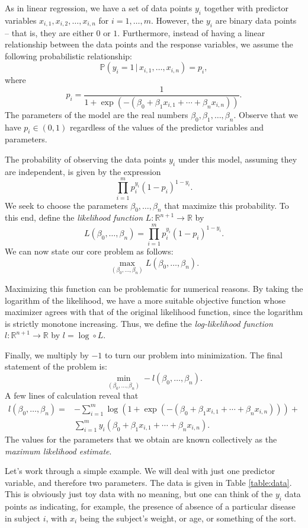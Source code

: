 As in linear regression, we have a set of data points $y_i$ together with predictor variables
$x_{i,1}, x_{i,2}, \ldots, x_{i,n}$ for $i = 1, \ldots, m$. However, the $y_i$ are binary data points --
that is, they are either $0$ or $1$. Furthermore, instead of having a linear relationship between the
data points and the response variables, we assume the following probabilistic relationship:
\[
\mathbb{P}(y_i = 1 \, | \, x_{i,1}, \ldots, x_{i,n}) = p_i,
\]
where
\[
p_i = \frac{1}{1+\exp(-(\beta_0 + \beta_1x_{i,1} + \cdots + \beta_nx_{i,n}))}.
\]
The parameters of the model are the real numbers $\beta_0, \beta_1,\ldots, \beta_n$.
Observe that we have $p_i \in (0, 1)$ regardless of the values of the predictor variables and parameters.

The probability of observing the data points $y_i$ under this model, assuming they are independent, is given by
the expression
\[
\prod_{i=1}^m p_i^{y_i}(1-p_i)^{1-y_i}.
\]
We seek to choose the parameters $\beta_0, \ldots, \beta_n$ that maximize this probability.
To this end, define the \emph{likelihood function} $L:\mathbb{R}^{n+1} \rightarrow \mathbb{R}$ by
\[
L(\beta_0, \ldots, \beta_n) = \prod_{i=1}^m p_i^{y_i}(1-p_i)^{1-y_i}.
\]
We can now state our core problem as follows:
\[
\max_{(\beta_0,\ldots,\beta_n)}L(\beta_0, \ldots, \beta_n).
\]

Maximizing this function can be problematic for numerical reasons. By taking the logarithm of the likelihood,
we have a more suitable objective function whose maximizer agrees with that of the original likelihood function,
since the logarithm is strictly monotone increasing. Thus, we define the \emph{log-likelihood function}
$l : \mathbb{R}^{n+1} \rightarrow \mathbb{R}$ by $l = \log \circ L$.

Finally, we multiply by $-1$ to turn our problem into minimization. The final statement of the problem is:
\[
\min_{(\beta_0,\ldots,\beta_n)}-l(\beta_0, \ldots, \beta_n).
\]
A few lines of calculation reveal that
\begin{align*}
l(\beta_0,\ldots,\beta_n) = &-\sum_{i=1}^{m}\log(1+\exp(-(\beta_0 + \beta_1x_{i,1} + \cdots +\beta_nx_{i,n}))) +\\
 &\sum_{i=1}^m y_i(\beta_0 + \beta_1x_{i,1} + \cdots + \beta_nx_{i,n}).
\end{align*}
The values for the parameters that we obtain are known collectively as the \emph{maximum likelihood estimate}.

Let's work through a simple example. We will deal with just one predictor variable, and therefore two parameters.
The data is given in Table \ref{table:data}.
This is obviously just toy data with no meaning, but one can think of the $y_i$ data points as indicating, for example, the
presence of absence of a particular disease in subject $i$, with $x_i$ being the subject's weight, or age, or something
of the sort.

